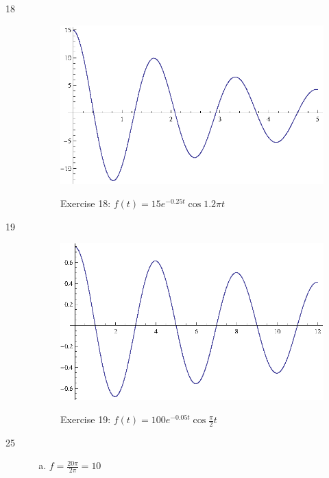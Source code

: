\documentclass{exam}
\begin{document}
\begin{description}
      \item[18]
        \begin{figure}[H]
          \centering
          \includegraphics{exercise18.eps}

          Exercise 18: $f(t) = 15 e^{-0.25t} \cos 1.2 \pi t$
        \end{figure}

      \item[19]
        \begin{figure}[H]
          \centering
          \includegraphics{exercise19.eps}

          Exercise 19: $f(t) = 100 e^{-0.05t} \cos \frac{\pi}{2} t$
        \end{figure}

      \item[25]
        \begin{enumerate}[(a)]
          \item $f = \frac{20 \pi}{2 \pi} = \boxed{ 10 }$


\end{enumerate}
\end{description}
\end{document}
